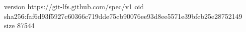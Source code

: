 version https://git-lfs.github.com/spec/v1
oid sha256:faf6d93f5927c60366c719dde75cb90076ee93d8ee5571e39bfcb25e28752149
size 87544
